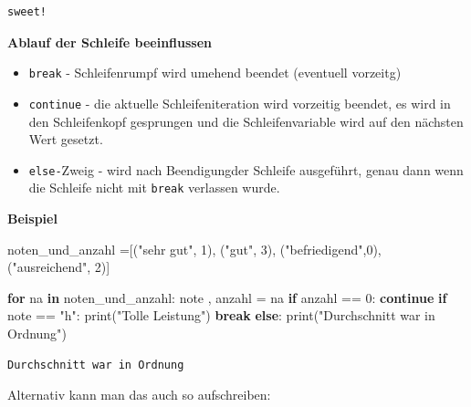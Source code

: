 \documentclass[
  11pt,
  a4paper,
  DIV=11,
  numbers=noendperiod]{scrartcl}
\newenvironment{Shaded}{\begin{snugshade}}{\end{snugshade}}
\newcommand{\BuiltInTok}[1]{\textcolor[rgb]{0.00,0.23,0.31}{#1}}
\newcommand{\ControlFlowTok}[1]{\textcolor[rgb]{0.00,0.23,0.31}{\textbf{#1}}}
\newcommand{\DecValTok}[1]{\textcolor[rgb]{0.68,0.00,0.00}{#1}}
\newcommand{\KeywordTok}[1]{\textcolor[rgb]{0.00,0.23,0.31}{\textbf{#1}}}
\newcommand{\NormalTok}[1]{\textcolor[rgb]{0.00,0.23,0.31}{#1}}
\newcommand{\OperatorTok}[1]{\textcolor[rgb]{0.37,0.37,0.37}{#1}}
\newcommand{\StringTok}[1]{\textcolor[rgb]{0.13,0.47,0.30}{#1}}
\providecommand{\tightlist}{%
  \setlength{\itemsep}{0pt}\setlength{\parskip}{0pt}}
\begin{document}
\begin{verbatim}
sweet!
\end{verbatim}

\textbf{Ablauf der Schleife beeinflussen}

\begin{itemize}
\tightlist
\item
  \texttt{break} - Schleifenrumpf wird umehend beendet (eventuell
  vorzeitg)
\item
  \texttt{continue} - die aktuelle Schleifeniteration wird vorzeitig
  beendet, es wird in den Schleifenkopf gesprungen und die
  Schleifenvariable wird auf den nächsten Wert gesetzt.
\item
  \texttt{else-}Zweig - wird nach Beendigungder Schleife ausgeführt,
  genau dann wenn die Schleife nicht mit \texttt{break} verlassen wurde.
\end{itemize}

\textbf{Beispiel}

\begin{Shaded}
\begin{Highlighting}[numbers=left,,]
\NormalTok{noten\_und\_anzahl }\OperatorTok{=}\NormalTok{[(}\StringTok{"sehr gut"}\NormalTok{, }\DecValTok{1}\NormalTok{), (}\StringTok{"gut"}\NormalTok{, }\DecValTok{3}\NormalTok{), (}\StringTok{"befriedigend"}\NormalTok{,}\DecValTok{0}\NormalTok{), (}\StringTok{"ausreichend"}\NormalTok{, }\DecValTok{2}\NormalTok{)]}

\ControlFlowTok{for}\NormalTok{ na }\KeywordTok{in}\NormalTok{ noten\_und\_anzahl:}
\NormalTok{    note , anzahl }\OperatorTok{=}\NormalTok{ na}
    \ControlFlowTok{if}\NormalTok{ anzahl }\OperatorTok{==} \DecValTok{0}\NormalTok{:}
        \ControlFlowTok{continue}
    \ControlFlowTok{if}\NormalTok{ note }\OperatorTok{==} \StringTok{"h"}\NormalTok{:}
        \BuiltInTok{print}\NormalTok{(}\StringTok{"Tolle Leistung"}\NormalTok{)}
        \ControlFlowTok{break}
\ControlFlowTok{else}\NormalTok{:}
    \BuiltInTok{print}\NormalTok{(}\StringTok{"Durchschnitt war in Ordnung"}\NormalTok{)}
     
\end{Highlighting}
\end{Shaded}

\begin{verbatim}
Durchschnitt war in Ordnung
\end{verbatim}

Alternativ kann man das auch so aufschreiben:
\end{document}
